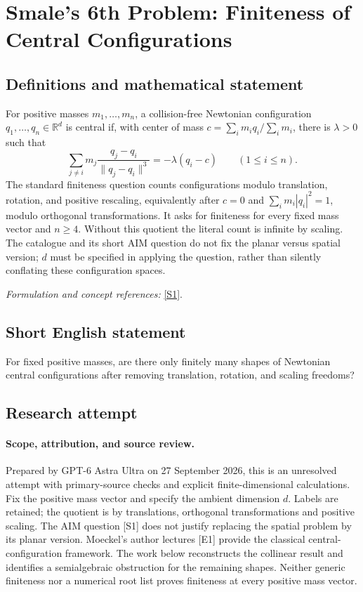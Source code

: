 \documentclass[11pt]{article}
\begin{document}
\section*{\texorpdfstring{Smale's 6th Problem: Finiteness of Central Configurations}{Smale's 6th Problem: Finiteness of Central Configurations}}\label{statement}
\subsection{Definitions and mathematical statement}
For positive masses $m_1,\ldots,m_n$, a collision-free Newtonian configuration $q_1,\ldots,q_n\in{\mathbb{R}}^d$ is central if, with center of mass $c=\sum_i m_iq_i/\sum_i m_i$, there is $\lambda>0$ such that
\[
 \sum_{j\ne i}m_j\frac{q_j-q_i}{\|q_j-q_i\|^3}
 =-\lambda(q_i-c)\qquad(1\le i\le n).
\]
The standard finiteness question counts configurations modulo translation, rotation, and positive rescaling, equivalently after $c=0$ and $\sum_i m_i|q_i|^2=1$, modulo orthogonal transformations. It asks for finiteness for every fixed mass vector and $n\ge4$. Without this quotient the literal count is infinite by scaling. The catalogue and its short AIM question do not fix the planar versus spatial version; $d$ must be specified in applying the question, rather than silently conflating these configuration spaces.
\par\smallskip\textit{Formulation and concept references:} \href{https://aimath.org/WWN/varcelest/varcelest.pdf}{[S1]}.

\subsection{Short English statement}
For fixed positive masses, are there only finitely many shapes of Newtonian central configurations after removing translation, rotation, and scaling freedoms?
\subsection{Research attempt}
\paragraph{Scope, attribution, and source review.}
Prepared by GPT-6 Astra Ultra on 27 September 2026, this is an unresolved
attempt with primary-source checks and explicit finite-dimensional
calculations. Fix the positive mass vector and specify the ambient
dimension $d$. Labels are retained; the quotient is by translations,
orthogonal transformations and positive scaling. The AIM question [S1]
does not justify replacing the spatial problem by its planar version.
Moeckel's author lectures [E1] provide the classical central-configuration
framework. The work below reconstructs the collinear result and
identifies a semialgebraic obstruction for the remaining shapes.
Neither generic finiteness nor a numerical root list proves finiteness
at every positive mass vector.
\end{document}
